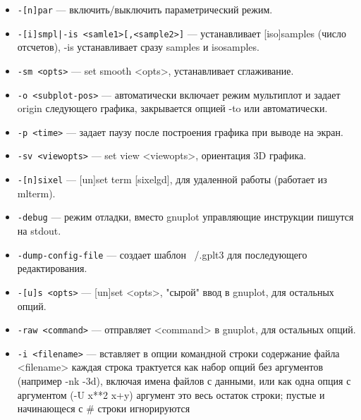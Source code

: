 \documentclass[12pt]{article}
\begin{document}
\begin{itemize}
\item \verb'-[n]par' --- включить/выключить параметрический режим.
\item \verb'-[i]smpl|-is <samle1>[,<sample2>]' --- устанавливает [iso]samples (число отсчетов), 
                                     -is устанавливает сразу samples и isosamples.
\item \verb'-sm <opts>' --- set smooth <opts>,  устанавливает сглаживание.
\item \verb'-o <subplot-pos>' --- автоматически включает режим мультиплот и задает origin 
   следующего графика, закрывается опцией -to или автоматически.
\item \verb'-p <time>' --- задает паузу после построения графика при выводе на экран.
\item \verb'-sv <viewopts>' --- set view <viewopts>, ориентация 3D графика.
\item \verb'-[n]sixel' --- [un]set term [sixelgd], для удаленной работы (работает из mlterm).
\item \verb'-debug' --- режим отладки, вместо gnuplot управляющие инструкции пишутся на stdout.
\item \verb'-dump-config-file' --- создает шаблон ~/.gplt3 для последующего редактирования.
\item \verb'-[u]s <opts>' --- [un]set <opts>,  "сырой" ввод в gnuplot, для остальных опций.
\item \verb'-raw <command>' --- отправляет <command> в gnuplot, для остальных опций.
\item \verb'-i <filename>' --- вставляет в опции командной строки содержание файла <filename>
   каждая строка трактуется как набор опций без аргументов (например -nk -3d), 
   включая имена файлов с данными, или как одна опция с аргументом (-U x**2 x+y)
   аргумент это весь остаток строки; пустые и начинающеся с \# строки игнорируются
\end{itemize}
\end{document}
